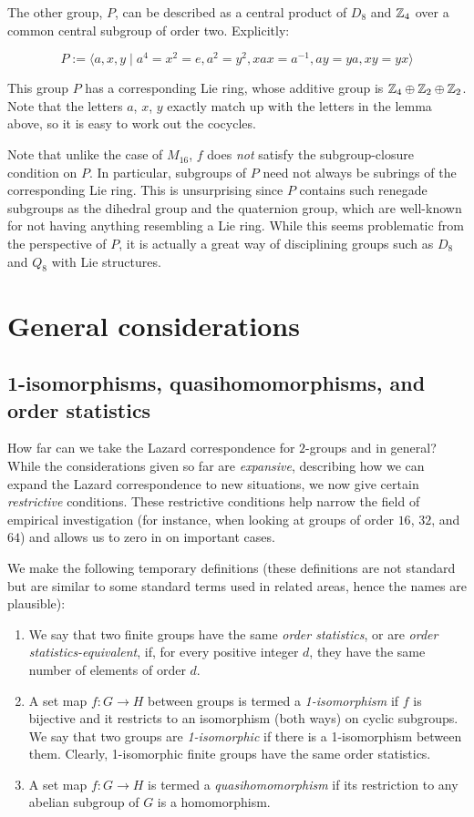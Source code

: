 \documentclass[10pt]{amsart}
\begin{document}
The other group, $P$, can be described as a central product of $D_8$
and $\mathbb{Z}_4$ over a common central subgroup of order two. Explicitly:

$$P := \langle a,x,y \mid a^4 = x^2 = e, a^2 = y^2, xax = a^{-1}, ay = ya, xy = yx \rangle$$

This group $P$ has a corresponding Lie ring, whose additive group is
$\mathbb{Z}_4 \oplus \mathbb{Z}_2 \oplus \mathbb{Z}_2$. Note that the letters $a$, $x$, $y$
exactly match up with the letters in the lemma above, so it is easy to
work out the cocycles.

Note that unlike the case of $M_{16}$, $f$ does {\em not} satisfy the
subgroup-closure condition on $P$. In particular, subgroups of $P$
need not always be subrings of the corresponding Lie ring. This is
unsurprising since $P$ contains such renegade subgroups as the
dihedral group and the quaternion group, which are well-known for not
having anything resembling a Lie ring. While this seems problematic
from the perspective of $P$, it is actually a great way of
disciplining groups such as $D_8$ and $Q_8$ with Lie structures.

\section{General considerations}

\subsection{1-isomorphisms, quasihomomorphisms, and order statistics}

How far can we take the Lazard correspondence for $2$-groups and in
general? While the considerations given so far are {\em expansive},
describing how we can expand the Lazard correspondence to new
situations, we now give certain {\em restrictive} conditions. These
restrictive conditions help narrow the field of empirical
investigation (for instance, when looking at groups of order $16$,
$32$, and $64$) and allows us to zero in on important cases.

We make the following temporary definitions (these definitions are not
standard but are similar to some standard terms used in related areas,
hence the names are plausible):

\begin{enumerate}
\item We say that two finite groups have the same {\em order
  statistics}, or are {\em order statistics-equivalent}, if, for every
  positive integer $d$, they have the same number of elements of order $d$.
\item A set map $f:G \to H$ between groups is termed a {\em
  1-isomorphism} if $f$ is bijective and it restricts to an
  isomorphism (both ways) on cyclic subgroups. We say that two groups
  are {\em 1-isomorphic} if there is a 1-isomorphism between
  them. Clearly, 1-isomorphic finite groups have the same order statistics.
\item A set map $f:G \to H$ is termed a {\em quasihomomorphism} if its
  restriction to any abelian subgroup of $G$ is a homomorphism.
\end{enumerate}
\end{document}

